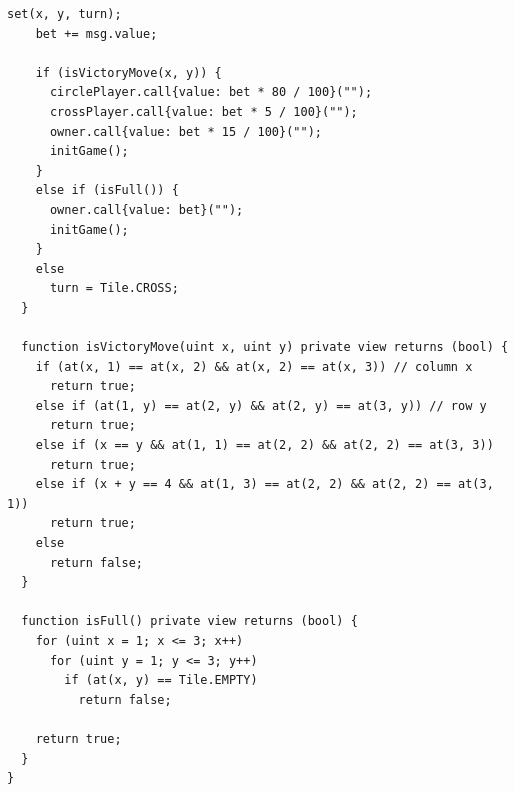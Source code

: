 \documentclass{article}
\begin{document}
\begin{lstlisting}[language=Solidity,numbers=none]
    set(x, y, turn);
    bet += msg.value;

    if (isVictoryMove(x, y)) {
      circlePlayer.call{value: bet * 80 / 100}("");
      crossPlayer.call{value: bet * 5 / 100}("");
      owner.call{value: bet * 15 / 100}("");
      initGame();
    }
    else if (isFull()) {
      owner.call{value: bet}("");
      initGame();
    }
    else
      turn = Tile.CROSS;
  }

  function isVictoryMove(uint x, uint y) private view returns (bool) {
    if (at(x, 1) == at(x, 2) && at(x, 2) == at(x, 3)) // column x
      return true;
    else if (at(1, y) == at(2, y) && at(2, y) == at(3, y)) // row y
      return true;
    else if (x == y && at(1, 1) == at(2, 2) && at(2, 2) == at(3, 3))
      return true;
    else if (x + y == 4 && at(1, 3) == at(2, 2) && at(2, 2) == at(3, 1))
      return true;
    else
      return false;
  }

  function isFull() private view returns (bool) {
    for (uint x = 1; x <= 3; x++)
      for (uint y = 1; y <= 3; y++)
        if (at(x, y) == Tile.EMPTY)
          return false;

    return true;
  }
}
\end{lstlisting}
\end{document}
